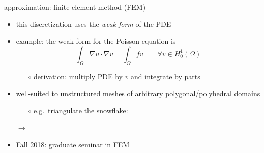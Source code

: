 \documentclass[hide notes,intlimits,usenames,dvipsnames]{beamer}
\newcommand{\grad}{\nabla}
\begin{document}
\begin{frame}{approximation: finite element method (FEM)}
\begin{itemize}
\item this discretization uses the \emph{weak form} of the PDE
\item example: the weak form for the Poisson equation is
    $$\int_\Omega \grad u \cdot \grad v = \int_\Omega f v \qquad \forall v \in H_0^1(\Omega)$$
    \vspace{-4mm}
	\begin{itemize}
	\item[$\circ$] derivation: multiply PDE by $v$ and integrate by parts
	\end{itemize}
\item well-suited to unstructured meshes of arbitrary polygonal/polyhedral domains
	\begin{itemize}
	\item[$\circ$] e.g.~triangulate the snowflake:
	\end{itemize}

\begin{center}
\begin{tikzpicture}[scale=1.3,baseline]  \end{tikzpicture}
\qquad $\to$ \qquad
\begin{tikzpicture}[scale=1.3,baseline]  \end{tikzpicture}
\end{center}

\footnotesize
\item \alert{Fall 2018: graduate seminar in FEM}
\end{itemize}
\end{frame}
\end{document}
